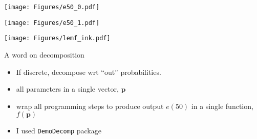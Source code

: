 \documentclass[20pt,usenames,dvipsnames]{beamer}
\begin{document}
\begin{frame}[plain]
\vspace{-1em}
\begin{center}
\texttt{[image: Figures/e50\_0.pdf]}
\end{center}
\end{frame}
\begin{frame}[plain]
\vspace{-1em}
\begin{center}
\texttt{[image: Figures/e50\_1.pdf]}
\end{center}
\end{frame}

%

\begin{frame}[plain]
\Large\begin{center}
\texttt{[image: Figures/lemf\_ink.pdf]}
\end{center}
\end{frame}

\begin{frame}[plain]
\Large
A word on decomposition
\vspace{2em}
\begin{itemize}[<+->]
\item If discrete, decompose wrt ``out'' probabilities.
\item all parameters in a single vector, $\textbf{p}$
\item wrap all programming steps to produce output $e(50)$ in a single function, $f(\textbf{p})$
\item I used \texttt{DemoDecomp} package
\end{itemize}
\end{frame}
\end{document}
